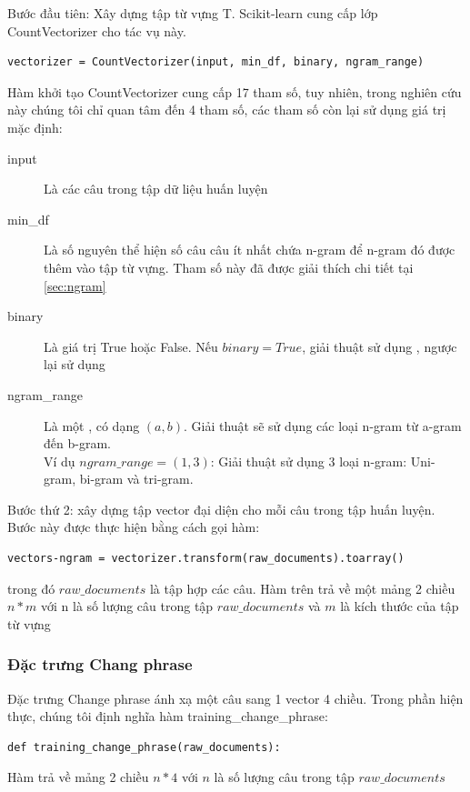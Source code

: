 Bước đầu tiên: Xây dựng tập từ vựng T. Scikit-learn cung cấp lớp CountVectorizer cho tác vụ này.
\begin{lstlisting}
vectorizer = CountVectorizer(input, min_df, binary, ngram_range)
\end{lstlisting}
Hàm khởi tạo CountVectorizer cung cấp 17 tham số, tuy nhiên, trong nghiên cứu này chúng tôi chỉ quan tâm đến 4 tham số, các tham số còn lại sử dụng giá trị mặc định:
\begin{description}
\item[input] Là các câu trong tập dữ liệu huấn luyện
\item[min\_df] Là số nguyên thể hiện số câu câu ít nhất chứa n-gram để n-gram đó được thêm vào tập từ vựng. Tham số này đã được giải thích chi tiết tại \ref{sec:ngram}
\item[binary] Là giá trị True hoặc False. Nếu $binary=True$, giải thuật sử dụng \footnotemark, 
ngược lại sử dụng \footnotemark
 \item[ngram\_range] Là một , có dạng $(a, b)$. Giải thuật sẽ sử dụng các loại n-gram từ a-gram đến b-gram. \\
 Ví dụ $ngram\_range = (1,3)$: Giải thuật sử dụng 3 loại n-gram: Uni-gram, bi-gram và tri-gram.
\end{description}

Bước thứ 2: xây dựng tập vector đại diện cho mỗi câu trong tập huấn luyện. Bước này được thực hiện bằng cách gọi hàm:
\begin{lstlisting}
vectors-ngram = vectorizer.transform(raw_documents).toarray()
\end{lstlisting}
trong đó $raw\_documents$ là tập hợp các câu. Hàm trên trả về một mảng 2 chiều $n*m$ với n là số lượng câu trong tập $raw\_documents$ và $m$ là kích thước của tập từ vựng
\subsubsection*{Đặc trưng Chang phrase}
Đặc trưng Change phrase ánh xạ một câu sang 1 vector 4 chiều. Trong phần hiện thực, chúng tôi định nghĩa hàm training\_change\_phrase:
\begin{lstlisting}
def training_change_phrase(raw_documents):
\end{lstlisting}
Hàm trả về mảng 2 chiều $n*4$ với $n$ là số lượng câu trong tập $raw\_documents$

